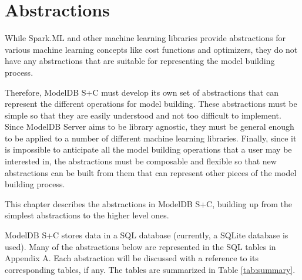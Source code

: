 \chapter{Abstractions}
While Spark.ML and other machine learning libraries provide abstractions for various machine
learning concepts like cost functions and optimizers, they do not have any abstractions
that are suitable for representing the model building process.

Therefore, ModelDB S+C must develop its own set of abstractions that can represent
the different operations for model building. These abstractions must be simple so
that they are easily understood and not too difficult to implement. Since ModelDB
Server aims to be library agnostic, they must be general enough to be applied to
a number of different machine learning libraries. Finally, since it is impossible
to anticipate all the model building operations that a user may be interested in,
the abstractions must be composable and flexible so that new abstractions can be built 
from them that can represent other pieces of the model building process.

This chapter describes the abstractions in ModelDB S+C, building up from the
simplest abstractions to the higher level ones.

ModelDB S+C stores data in a SQL database (currently, a SQLite database is
used). Many of the abstractions below are represented in the SQL tables in Appendix A.
Each abstraction will be discussed with a reference to its corresponding tables, if any.
The tables are summarized in Table \ref{tab:summary}.

